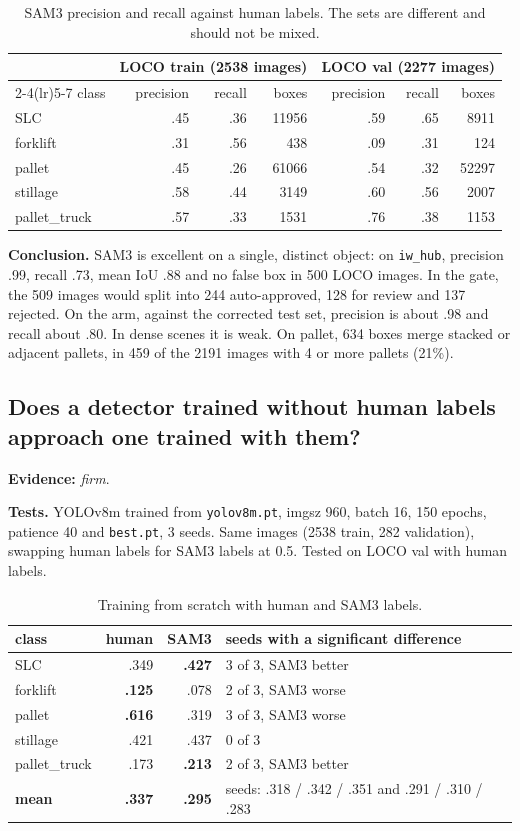 \documentclass[11pt,a4paper]{article}
\newcommand{\evidence}[1]{\noindent\textbf{Evidence:} \emph{#1}.\par}
\newcommand{\tests}{\noindent\textbf{Tests.} }
\newcommand{\conclusion}{\noindent\textbf{Conclusion.} }
\begin{document}
\begin{table}[H]
\centering\small
\caption{SAM3 precision and recall against human labels. The sets are different
and should not be mixed.}
\label{tab:sam3q}
\begin{tabular}{lrrrrrr}
\toprule
& \multicolumn{3}{c}{LOCO train (2538 images)} & \multicolumn{3}{c}{LOCO val (2277 images)} \\
\cmidrule(lr){2-4}\cmidrule(lr){5-7}
class & precision & recall & boxes & precision & recall & boxes \\
\midrule
SLC & .45 & .36 & 11956 & .59 & .65 & 8911 \\
forklift & .31 & .56 & 438 & .09 & .31 & 124 \\
pallet & .45 & .26 & 61066 & .54 & .32 & 52297 \\
stillage & .58 & .44 & 3149 & .60 & .56 & 2007 \\
pallet\_truck & .57 & .33 & 1531 & .76 & .38 & 1153 \\
\bottomrule
\end{tabular}
\end{table}

\conclusion SAM3 is excellent on a single, distinct object: on \texttt{iw\_hub},
precision .99, recall .73, mean IoU .88 and no false box in 500 LOCO images. In the
gate, the 509 images would split into 244 auto-approved, 128 for review and 137
rejected. On the arm, against the corrected test set, precision is about .98 and
recall about .80. In dense scenes it is weak. On pallet, 634 boxes merge stacked or
adjacent pallets, in 459 of the 2191 images with 4 or more pallets (21\%).

\subsection{Does a detector trained without human labels approach one trained with them?}
\evidence{firm}

\tests YOLOv8m trained from \texttt{yolov8m.pt}, imgsz 960, batch 16, 150 epochs,
patience 40 and \texttt{best.pt}, 3 seeds. Same images (2538 train, 282
validation), swapping human labels for SAM3 labels at 0.5. Tested on LOCO val with
human labels.

\begin{table}[H]
\centering\small
\caption{Training from scratch with human and SAM3 labels.}
\begin{tabular}{lrrl}
\toprule
class & human & SAM3 & seeds with a significant difference \\
\midrule
SLC & .349 & \textbf{.427} & 3 of 3, SAM3 better \\
forklift & \textbf{.125} & .078 & 2 of 3, SAM3 worse \\
pallet & \textbf{.616} & .319 & 3 of 3, SAM3 worse \\
stillage & .421 & .437 & 0 of 3 \\
pallet\_truck & .173 & \textbf{.213} & 2 of 3, SAM3 better \\
\textbf{mean} & \textbf{.337} & \textbf{.295} & seeds: .318 / .342 / .351 and .291 / .310 / .283 \\
\bottomrule
\end{tabular}
\end{table}
\end{document}

